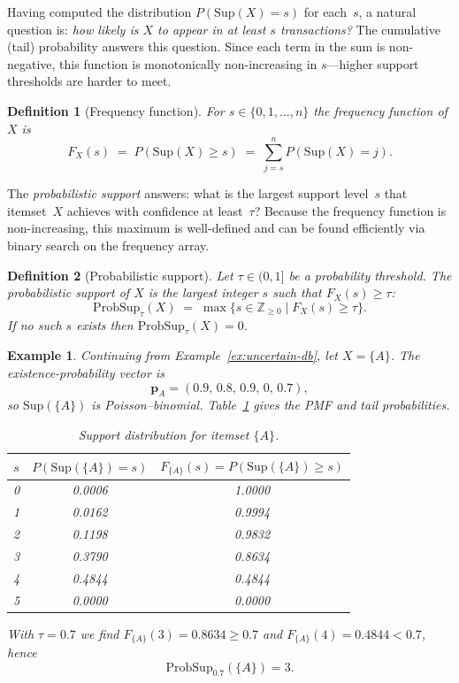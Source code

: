 \documentclass[10pt,letterpaper]{article}
\newtheorem{definition}{Definition}[section]
\newtheorem{example}{Example}[section]
\newcounter{definition}
\newcounter{example}
\begin{document}
Having computed the distribution $P(\mathrm{Sup}(X) = s)$ for each~$s$, a
natural question is: \emph{how likely is $X$ to appear in at least $s$
transactions?} The cumulative (tail) probability answers this question. Since
each term in the sum is non-negative, this function is monotonically
non-increasing in $s$---higher support thresholds are harder to meet.

\begin{definition}[Frequency function]
\label{def:freqfn}
For $s\in\{0,1,\dots,n\}$ the frequency function of $X$ is
\begin{equation}
F_X(s) \;=\; P(\mathrm{Sup}(X)\ge s) \;=\; \sum_{j=s}^n P(\mathrm{Sup}(X)=j).
\label{eq:FreqFn}
\end{equation}
\end{definition}

The \emph{probabilistic support} answers: what is the largest support level~$s$
that itemset~$X$ achieves with confidence at least~$\tau$? Because the
frequency function is non-increasing, this maximum is well-defined and can be
found efficiently via binary search on the frequency array.

\begin{definition}[Probabilistic support]
\label{def:probsup}
Let $\tau\in(0,1]$ be a probability threshold. The probabilistic support of $X$ is the largest integer $s$ such that $F_X(s)\ge\tau$:
\begin{equation}
\mathrm{ProbSup}_{\tau}(X) \;=\; \max\{s\in\mathbb{Z}_{\ge0} \mid F_X(s)\ge\tau\}.
\label{eq:ProbSup}
\end{equation}
If no such $s$ exists then $\mathrm{ProbSup}_{\tau}(X)=0$.
\end{definition}

\begin{example}
\label{ex:probA}
Continuing from Example~\ref{ex:uncertain-db}, let $X=\{A\}$. The existence-probability vector is
\[
\mathbf{p}_A = (0.9,\,0.8,\,0.9,\,0,\,0.7),
\]
so $\mathrm{Sup}(\{A\})$ is Poisson--binomial. Table~\ref{tab:support_dist_A} gives the PMF and tail probabilities.

\begin{table}[H]
\caption{Support distribution for itemset $\{A\}$.}
\label{tab:support_dist_A}
\centering
\begin{tabular}{c c c}
\hline
$s$ & $P(\mathrm{Sup}(\{A\})=s)$ & $F_{\{A\}}(s)=P(\mathrm{Sup}(\{A\})\ge s)$ \\
\hline
0 & 0.0006 & 1.0000 \\
1 & 0.0162 & 0.9994 \\
2 & 0.1198 & 0.9832 \\
3 & 0.3790 & 0.8634 \\
4 & 0.4844 & 0.4844 \\
5 & 0.0000 & 0.0000 \\
\hline
\end{tabular}
\end{table}

With $\tau=0.7$ we find $F_{\{A\}}(3)=0.8634\ge0.7$ and $F_{\{A\}}(4)=0.4844<0.7$, hence
\[
\mathrm{ProbSup}_{0.7}(\{A\}) = 3.
\]
\end{example}
\end{document}
